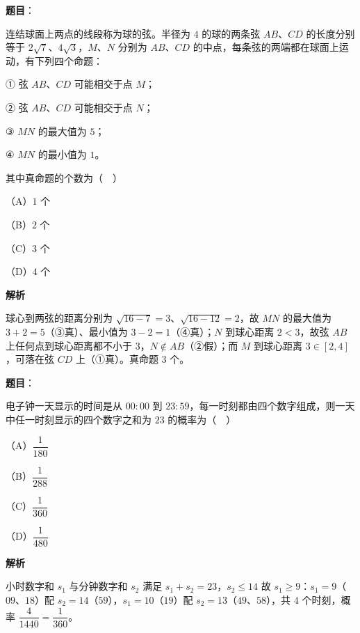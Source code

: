 \begin{answer}

\textbf{题目}：

连结球面上两点的线段称为球的弦。半径为 $4$ 的球的两条弦 $AB$、$CD$ 的长度分别等于 $2\sqrt7$、$4\sqrt3$，$M$、$N$ 分别为 $AB$、$CD$ 的中点，每条弦的两端都在球面上运动，有下列四个命题：

① 弦 $AB$、$CD$ 可能相交于点 $M$；

② 弦 $AB$、$CD$ 可能相交于点 $N$；

③ $MN$ 的最大值为 $5$；

④ $MN$ 的最小值为 $1$。

其中真命题的个数为（　）

（A）$1$ 个

（B）$2$ 个

（C）$3$ 个

（D）$4$ 个

\textbf{解析}

球心到两弦的距离分别为 $\sqrt{16-7}=3$、$\sqrt{16-12}=2$，故 $MN$ 的最大值为 $3+2=5$（③真）、最小值为 $3-2=1$（④真）；$N$ 到球心距离 $2<3$，故弦 $AB$ 上任何点到球心距离都不小于 $3$，$N\notin AB$（②假）；而 $M$ 到球心距离 $3\in[2,4]$，可落在弦 $CD$ 上（①真）。真命题 $3$ 个。


\end{answer}
\begin{answer}

\textbf{题目}：

电子钟一天显示的时间是从 $00\!:\!00$ 到 $23\!:\!59$，每一时刻都由四个数字组成，则一天中任一时刻显示的四个数字之和为 $23$ 的概率为（　）

（A）$\dfrac1{180}$

（B）$\dfrac1{288}$

（C）$\dfrac1{360}$

（D）$\dfrac1{480}$

\textbf{解析}

小时数字和 $s_1$ 与分钟数字和 $s_2$ 满足 $s_1+s_2=23$，$s_2\leqslant14$ 故 $s_1\geqslant9$：$s_1=9$（$09$、$18$）配 $s_2=14$（$59$），$s_1=10$（$19$）配 $s_2=13$（$49$、$58$），共 $4$ 个时刻，概率 $\dfrac4{1440}=\dfrac1{360}$。


\end{answer}
